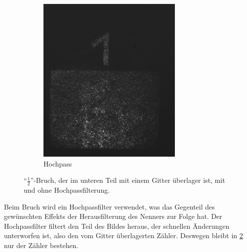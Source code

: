 \documentclass[
	a4paper,
	12pt,
	pagesize,
	ngerman
]{scrartcl}
\begin{document}
\begin{figure}[H]
\begin{subfigure}[b]{0.275\textwidth}
            \includegraphics[width=\textwidth]{raw/4/4_halb_hochpass}
            \caption[]%
            {Hochpass}
            \label{fig_4_halb_filter}
        \end{subfigure}
        \caption%
        {
				\enquote{$\frac{1}{2}$}-Bruch, der im unteren Teil mit einem Gitter überlager ist, mit und ohne Hochpassfilterung.
				}
        \label{fig_4_halb}
    \end{figure}
	Beim Bruch wird ein Hochpassfilter verwendet, was das Gegenteil des gewünschten Effekts der Herausfilterung des Nenners zur Folge hat.
	Der Hochpassfilter filtert den Teil des Bildes heraus, der schnellen Änderungen unterworfen ist, also den vom Gitter überlagerten Zähler.
	Deswegen bleibt in \cref{fig_4_halb} nur der Zähler bestehen.
\end{document}

